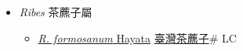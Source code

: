
  \begin{itemize}
 \item[] \textit{Ribes} 茶藨子屬
                    
  \begin{itemize}
        \item[] \href{http://www.theplantlist.org/tpl1.1/search?q=Ribes+formosanum}{\textit{R. formosanum} Hayata}   \href{\detokenize{http://taibnet.sinica.edu.tw/chi/taibnet_species_list.php?T2=臺灣茶藨子&T2_new_value=true&fr=y}}{臺灣茶藨子}\# LC
  \end{itemize}
  \end{itemize}
